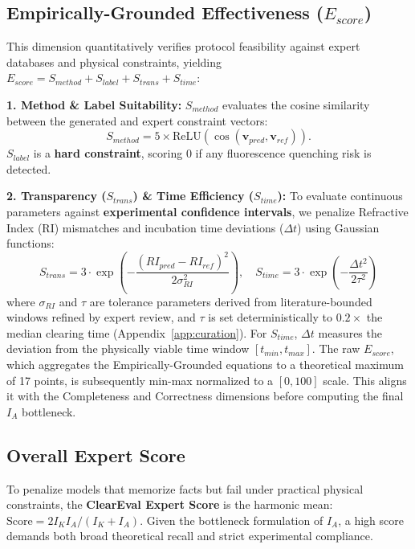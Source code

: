 \documentclass[conference]{IEEEtran}
\begin{document}
\subsection{Empirically-Grounded Effectiveness ($E_{score}$)}
This dimension quantitatively verifies protocol feasibility against expert
databases and physical constraints, yielding
$E_{score} = S_{method} + S_{label} + S_{trans} + S_{time}$:

\noindent\textbf{1. Method \& Label Suitability:}
$S_{method}$ evaluates the cosine similarity between the generated and expert
constraint vectors:
\begin{equation}
S_{method} = 5 \times \text{ReLU}(\cos(\mathbf{v}_{pred}, \mathbf{v}_{ref})).
\end{equation}
$S_{label}$ is a \textbf{hard constraint}, scoring 0 if any fluorescence
quenching risk is detected.

\noindent\textbf{2. Transparency ($S_{trans}$) \& Time Efficiency
($S_{time}$):}
To evaluate continuous parameters against \textbf{experimental confidence
intervals}, we penalize Refractive Index (RI) mismatches and incubation time
deviations ($\Delta t$) using Gaussian functions:
\begin{equation}
S_{trans} = 3 \cdot \exp \left( - \frac{(RI_{pred} - RI_{ref})^2}{2\sigma_{RI}^2} \right), \quad
S_{time} = 3 \cdot \exp \left( - \frac{\Delta t^2}{2\tau^2} \right)
\end{equation}
where $\sigma_{RI}$ and $\tau$ are tolerance parameters derived from
literature-bounded windows refined by expert review, and $\tau$ is set
deterministically to $0.2\times$ the median clearing time (Appendix~\ref{app:curation}).
For $S_{time}$, $\Delta t$ measures the deviation from the physically viable
time window $[t_{min}, t_{max}]$. The raw $E_{score}$, which aggregates the
Empirically-Grounded equations to a theoretical maximum of 17 points, is
subsequently min-max normalized to a $[0, 100]$ scale. This aligns it with the
Completeness and Correctness dimensions before computing the final $I_A$
bottleneck.

\subsection{Overall Expert Score}
To penalize models that memorize facts but fail under practical physical
constraints, the \textbf{ClearEval Expert Score} is the harmonic mean:
$\text{Score} = 2 I_K I_A / (I_K + I_A)$. Given the bottleneck formulation of
$I_A$, a high score demands both broad theoretical recall and strict
experimental compliance.
\end{document}

